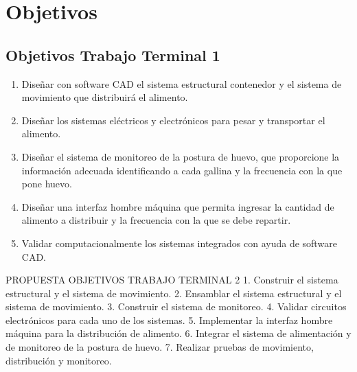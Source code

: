 \section{Objetivos}

\subsection{Objetivos Trabajo Terminal 1}
\begin{enumerate}
    \item Diseñar con software CAD el sistema estructural contenedor y el sistema de movimiento que distribuirá el alimento.
    \item Diseñar los sistemas eléctricos y electrónicos para pesar y transportar el alimento.
    \item Diseñar el sistema de monitoreo de la postura de huevo, que proporcione la información adecuada identificando a cada gallina y la frecuencia con la que pone huevo.
    \item Diseñar una interfaz hombre máquina que permita ingresar la cantidad de alimento a distribuir y la frecuencia con la que se debe repartir.
    \item Validar computacionalmente los sistemas integrados con ayuda de software CAD.
\end{enumerate}

PROPUESTA OBJETIVOS TRABAJO TERMINAL 2
1.	Construir el sistema estructural y el sistema de movimiento.
2.	Ensamblar el sistema estructural y el sistema de movimiento.
3.	Construir el sistema de monitoreo.
4.	Validar circuitos electrónicos para cada uno de los sistemas.
5.	Implementar la interfaz hombre máquina para la distribución de alimento.
6.	Integrar el sistema de alimentación y de monitoreo de la postura de huevo.
7.	Realizar pruebas de movimiento, distribución y monitoreo.
